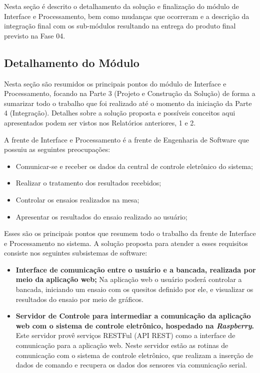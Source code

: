 \label{desenvolvimento_processamento}

Nesta seção é descrito o detalhamento da solução e finalização do módulo de Interface e Processamento,
bem como mudanças que ocorreram e a descrição da integração final com os sub-módulos resultando na
entrega do produto final previsto na Fase 04.

\subsection{Detalhamento do Módulo}

Nesta seção são resumidos os principais pontos do módulo de Interface e Processamento, focando na Parte 3 (Projeto e Construção da Solução)
de forma a sumarizar todo o trabalho que foi realizado até o momento da iniciação da Parte 4 (Integração).
Detalhes sobre a solução proposta e possíveis conceitos aqui apresentados podem ser vistos nos Relatórios anteriores, 1 e 2.

A frente de Interface e Processamento é a frente de Engenharia de Software que possuiu as seguintes preocupações:

\begin{itemize}
  \item Comunicar-se e receber os dados da central de controle eletrônico do sistema;
  \item Realizar o tratamento dos resultados recebidos;
  \item Controlar os ensaios realizados na mesa;
  \item Apresentar os resultados do ensaio realizado ao usuário;
\end{itemize}

Esses são os principais pontos que resumem todo o trabalho da frente de Interface e Processamento no sistema.
A solução proposta para atender a esses requisitos consiste nos seguintes subsistemas de software:

\begin{itemize}
 \item \textbf{Interface de comunicação entre o usuário e a bancada, realizada por meio da aplicação web;}
      \subitem Na aplicação web o usuário poderá controlar a bancada, iniciando um ensaio com os quesitos definido por ele,
	       e visualizar os resultados do ensaio por meio de gráficos.
 \item \textbf{Servidor de Controle para intermediar a comunicação da aplicação web com o sistema de controle eletrônico, hospedado na \textit{Raspberry}.}
      \subitem Este servidor provê serviços RESTFul (API REST) como a interface de comunicação para a aplicação web. Neste servidor estão as
	       rotinas de comunicação com o sistema de controle eletrônico, que realizam a inserção de dados de comando e recupera os dados
	       dos sensores via comunicação serial.
\end{itemize}

